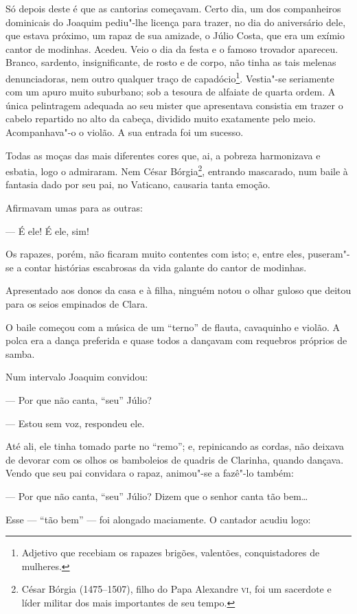 Só depois deste é que as cantorias começavam. Certo dia, um dos
companheiros dominicais do Joaquim pediu"-lhe licença para trazer, no dia
do aniversário dele, que estava próximo, um rapaz de sua amizade, o
Júlio Costa, que era um exímio cantor de modinhas. Acedeu. Veio o dia da
festa e o famoso trovador apareceu. Branco, sardento, insignificante, de
rosto e de corpo, não tinha as tais melenas denunciadoras, nem outro
qualquer traço de capadócio\footnote{Adjetivo que recebiam os rapazes
  brigões, valentões, conquistadores de mulheres.}. Vestia"-se seriamente
com um apuro muito suburbano; sob a tesoura de alfaiate de quarta ordem.
A única pelintragem adequada ao seu mister que apresentava consistia em
trazer o cabelo repartido no alto da cabeça, dividido muito exatamente
pelo meio. Acompanhava"-o o violão. A sua entrada foi um sucesso.

Todas as moças das mais diferentes cores que, ai, a pobreza harmonizava
e esbatia, logo o admiraram. Nem César Bórgia\footnote{César Bórgia
  (1475--1507), filho do Papa Alexandre \textsc{vi}, foi um sacerdote e líder
  militar dos mais importantes de seu tempo.}, entrando mascarado, num
baile à fantasia dado por seu pai, no Vaticano, causaria tanta emoção.

Afirmavam umas para as outras:

--- É ele! É ele, sim!

Os rapazes, porém, não ficaram muito contentes com isto; e, entre eles,
puseram"-se a contar histórias escabrosas da vida galante do cantor de
modinhas.

Apresentado aos donos da casa e à filha, ninguém notou o olhar guloso
que deitou para os seios empinados de Clara.

O baile começou com a música de um ``terno'' de flauta, cavaquinho e
violão. A polca era a dança preferida e quase todos a dançavam com
requebros próprios de samba.

Num intervalo Joaquim convidou:

--- Por que não canta, ``seu'' Júlio?

--- Estou sem voz, respondeu ele.

Até ali, ele tinha tomado parte no ``remo''; e, repinicando as cordas, não
deixava de devorar com os olhos os bamboleios de quadris de Clarinha,
quando dançava. Vendo que seu pai convidara o rapaz, animou"-se a fazê"-lo
também:

--- Por que não canta, ``seu'' Júlio? Dizem que o senhor canta tão bem\ldots{}

Esse --- ``tão bem'' --- foi alongado maciamente. O cantador acudiu logo:

